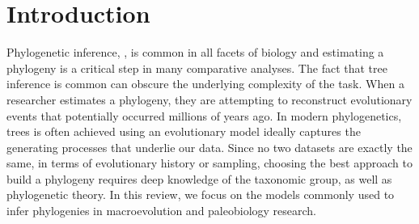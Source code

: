 
\section{Introduction}


Phylogenetic inference, , is common in all facets of biology and estimating a phylogeny is a critical step in many comparative analyses. The fact that tree inference is common can obscure the underlying complexity of the task.
When a researcher estimates a phylogeny, they are attempting to reconstruct evolutionary events that potentially occurred millions of years ago.
In modern phylogenetics,  trees is often achieved  using an evolutionary model  ideally captures the generating processes that underlie our data.
Since no two datasets are exactly the same, in terms of evolutionary history or  sampling, choosing the best approach to build a phylogeny requires deep knowledge of the taxonomic group, as well as phylogenetic theory.
In this review, we focus on the models commonly used to infer phylogenies in macroevolution and paleobiology research.


